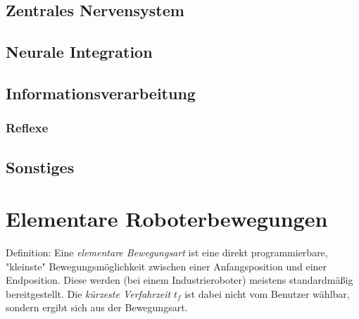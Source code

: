 		\subsection{Zentrales Nervensystem} %

		\subsection{Neurale Integration} %

		\subsection{Informationsverarbeitung} %

			\subsubsection{Reflexe} %

		\subsection{Sonstiges} %

	\section{Elementare Roboterbewegungen}
		Definition: Eine \emph{elementare Bewegungsart} ist eine direkt programmierbare, "kleinste" Bewegungsmöglichkeit zwischen einer Anfangsposition und einer Endposition. Diese werden (bei einem Industrieroboter) meistens standardmäßig bereitgestellt. Die \emph{kürzeste Verfahrzeit} \(t_f\) ist dabei \iA nicht vom Benutzer wählbar, sondern ergibt sich aus der Bewegungsart.
		
